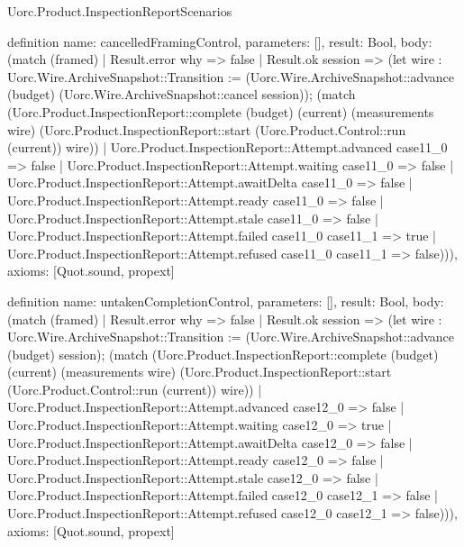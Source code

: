 \begin{lexlean}{Uorc.Product.InspectionReportScenarios}
\begin{semanticmodule}
definition{
  name: cancelledFramingControl,
  parameters: [],
  result: Bool,
  body: (match (framed)
    | Result.error why => false
    | Result.ok session => (let wire : Uorc.Wire.ArchiveSnapshot::Transition := (Uorc.Wire.ArchiveSnapshot::advance (budget) (Uorc.Wire.ArchiveSnapshot::cancel session)); (match (Uorc.Product.InspectionReport::complete (budget) (current) (measurements wire) (Uorc.Product.InspectionReport::start (Uorc.Product.Control::run (current)) wire))
      | Uorc.Product.InspectionReport::Attempt.advanced case11_0 => false
      | Uorc.Product.InspectionReport::Attempt.waiting case11_0 => false
      | Uorc.Product.InspectionReport::Attempt.awaitDelta case11_0 => false
      | Uorc.Product.InspectionReport::Attempt.ready case11_0 => false
      | Uorc.Product.InspectionReport::Attempt.stale case11_0 => false
      | Uorc.Product.InspectionReport::Attempt.failed case11_0 case11_1 => true
      | Uorc.Product.InspectionReport::Attempt.refused case11_0 case11_1 => false))),
  axioms: [Quot.sound, propext]
}

definition{
  name: untakenCompletionControl,
  parameters: [],
  result: Bool,
  body: (match (framed)
    | Result.error why => false
    | Result.ok session => (let wire : Uorc.Wire.ArchiveSnapshot::Transition := (Uorc.Wire.ArchiveSnapshot::advance (budget) session); (match (Uorc.Product.InspectionReport::complete (budget) (current) (measurements wire) (Uorc.Product.InspectionReport::start (Uorc.Product.Control::run (current)) wire))
      | Uorc.Product.InspectionReport::Attempt.advanced case12_0 => false
      | Uorc.Product.InspectionReport::Attempt.waiting case12_0 => true
      | Uorc.Product.InspectionReport::Attempt.awaitDelta case12_0 => false
      | Uorc.Product.InspectionReport::Attempt.ready case12_0 => false
      | Uorc.Product.InspectionReport::Attempt.stale case12_0 => false
      | Uorc.Product.InspectionReport::Attempt.failed case12_0 case12_1 => false
      | Uorc.Product.InspectionReport::Attempt.refused case12_0 case12_1 => false))),
  axioms: [Quot.sound, propext]
}


\end{semanticmodule}
\end{lexlean}
